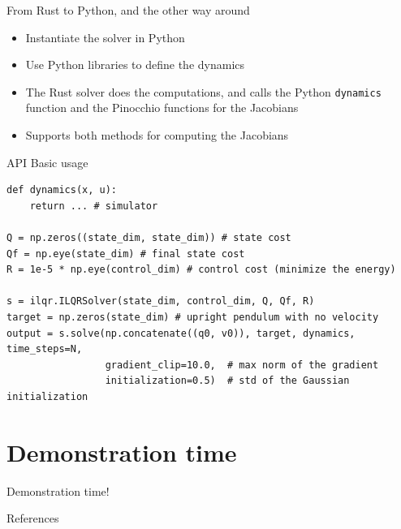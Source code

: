 \documentclass[aspectratio=169]{beamer}
\begin{document}
\begin{frame}{From Rust to Python, and the other way around}
    \begin{itemize}
        \item Instantiate the solver in Python
        \item Use Python libraries to define the dynamics
        \item The Rust solver does the computations, and calls the Python \texttt{dynamics} function and the Pinocchio functions for the Jacobians
        \item Supports both methods for computing the Jacobians
    \end{itemize}
\end{frame}

\begin{frame}[fragile]{API Basic usage}
    \begin{verbatim}
def dynamics(x, u):
    return ... # simulator

Q = np.zeros((state_dim, state_dim)) # state cost
Qf = np.eye(state_dim) # final state cost
R = 1e-5 * np.eye(control_dim) # control cost (minimize the energy)

s = ilqr.ILQRSolver(state_dim, control_dim, Q, Qf, R)
target = np.zeros(state_dim) # upright pendulum with no velocity
output = s.solve(np.concatenate((q0, v0)), target, dynamics, time_steps=N,
                 gradient_clip=10.0,  # max norm of the gradient
                 initialization=0.5)  # std of the Gaussian initialization
\end{verbatim}
\end{frame}

\section{Demonstration time}
\begin{frame}
    \begin{center}
        \huge Demonstration time!
    \end{center}
\end{frame}

\begin{frame}{References}
    \nocite{*}
    \printbibliography{}
\end{frame}
\end{document}
